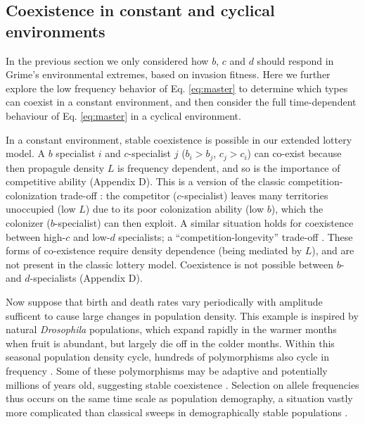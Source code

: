 \documentclass[11pt]{article}
\begin{document}
%

\subsection*{Coexistence in constant and cyclical environments}\label{sec:invas}

In the previous section we only considered how $b$, $c$ and $d$ should respond in Grime's environmental extremes, based on invasion fitness. Here we further explore the low frequency behavior of Eq. \eqref{eq:master} to determine which types can coexist in a constant environment, and then consider the full time-dependent behaviour of Eq. \eqref{eq:master} in a cyclical environment. 

In a constant environment, stable coexistence is possible in our extended lottery model. A $b$ specialist $i$ and $c$-specialist $j$ ($b_i>b_j$, $c_j>c_i$) can co-exist because then propagule density $L$ is frequency dependent, and so is the importance of competitive ability (Appendix D). This is a version of the classic competition-colonization trade-off \citep{tilman_94,levins_71}: the competitor ($c$-specialist) leaves many territories unoccupied (low $L$) due to its poor colonization ability (low $b$), which the colonizer ($b$-specialist) can then exploit. A similar situation holds for coexistence between high-$c$ and low-$d$ specialists; a ``competition-longevity'' trade-off \citep{tilman_94}. These forms of co-existence require density dependence (being mediated by $L$), and are not present in the classic lottery model. Coexistence is not possible between $b$- and $d$-specialists (Appendix D). 

Now suppose that birth and death rates vary periodically with amplitude sufficent to cause large changes in population density. This example is inspired by natural \textit{Drosophila} populations, which expand rapidly in the warmer months when fruit is abundant, but largely die off in the colder months. Within this seasonal population density cycle, hundreds of polymorphisms also cycle in frequency \citep{bergland_14}. Some of these polymorphisms may be adaptive and potentially millions of years old, suggesting stable coexistence \citep{bergland_14,messer_2016}. Selection on allele frequencies thus occurs on the same time scale as population demography, a situation vastly more complicated than classical sweeps in demographically stable populations \citep{messer_2016}.
\end{document}
